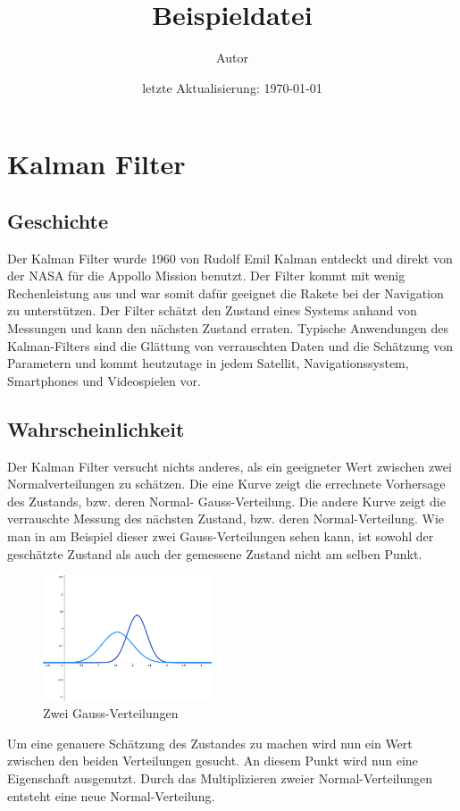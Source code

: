 \documentclass[11pt,a4paper]{article}
\title{\bf {Beispieldatei}}
\author{\vspace{2cm}
  Autor}
\date{\vspace{3cm} %
      letzte Aktualisierung: \today}
\begin{document}
\section{Kalman Filter}
\subsection{Geschichte}
Der Kalman Filter wurde 1960 von Rudolf Emil Kalman entdeckt und direkt von der NASA für die Appollo Mission benutzt. Der Filter kommt mit wenig Rechenleistung aus und war somit dafür geeignet die Rakete bei der Navigation zu unterstützen. Der Filter schätzt den Zustand eines Systems anhand von Messungen und kann den nächsten Zustand erraten. Typische Anwendungen des Kalman-Filters sind die Glättung von verrauschten Daten und die Schätzung von Parametern und kommt heutzutage in jedem Satellit, Navigationssystem, Smartphones und Videospielen vor.

\subsection{Wahrscheinlichkeit}
Der Kalman Filter versucht nichts anderes, als ein geeigneter Wert zwischen zwei Normalverteilungen zu schätzen. Die eine Kurve zeigt die errechnete Vorhersage des Zustands, bzw. deren Normal- Gauss-Verteilung. Die andere Kurve zeigt die verrauschte Messung des nächsten Zustand, bzw. deren Normal-Verteilung. Wie man in am Beispiel dieser zwei Gauss-Verteilungen sehen kann, ist sowohl der geschätzte Zustand als auch der gemessene Zustand nicht am selben Punkt. 

\begin{figure}[h]
 \begin{center}
 \includegraphics[width=5cm]{Gausskurve2}
 \caption{Zwei Gauss-Verteilungen}
 \end{center}
\end{figure}
Um eine genauere Schätzung des Zustandes zu machen wird nun ein Wert zwischen den beiden Verteilungen gesucht. An diesem Punkt wird nun eine Eigenschaft ausgenutzt. Durch das Multiplizieren zweier Normal-Verteilungen entsteht eine neue Normal-Verteilung. 
\end{document}
